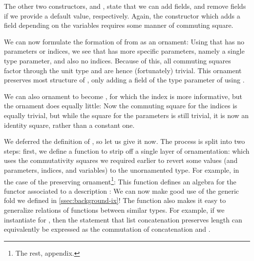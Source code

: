 The other two constructors,  and , state that we can add fields, and remove fields if we provide a default value, respectively. Again, the constructor  which adds a field depending on the variables requires some manner of commuting square.

We can now formulate the formation of  from \bN{} as an ornament:
Using that \bN{} has no parameters or indices, we see that  has more specific parameters, namely a single type parameter, and also no indices. Because of this, all commuting squares factor through the unit type and are hence (fortunately) trivial. This ornament preserves most structure of \bN{}, only adding a field of the type parameter of  using .

We can also ornament  to become , for which the index is more informative,
but the ornament does equally little:
Now the commuting square for the indices is equally trivial, but while the square for the parameters is still trivial, it is now an identity square, rather than a constant one.

We deferred the definition of , so let us give it now. The process is split into two steps: first, we define a function to strip off a single layer of ornamentation:
which uses the commutativity squares we required earlier to revert some values (and parameters, indices, and variables) to the unornamented type. For example, in the case of the  preserving ornament\footnote{The rest, appendix.}:
This function defines an algebra for the functor associated to a description :
We can now make good use of the generic fold we defined in \autoref{ssec:background-ix}!
The function  also makes it easy to generalize relations of functions between similar types. For example, if we instantiate  for , then the statement that list concatenation preserves length can equivalently be expressed as the commutation of concatenation and .


%